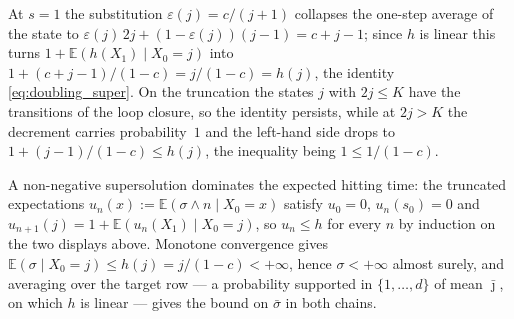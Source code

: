 At $s=1$ the substitution $\varepsilon(j)=c/(j+1)$ collapses the one-step average of the
state to $\varepsilon(j)\,2j+(1-\varepsilon(j))(j-1)=c+j-1$; since $h$ is linear this turns
$1+\mathbb E(h(X_1)\mid X_0=j)$ into $1+(c+j-1)/(1-c)=j/(1-c)=h(j)$, the identity
\eqref{eq:doubling_super}. On the truncation the states $j$ with $2j\leq K$ have the
transitions of the loop closure, so the identity persists, while at $2j>K$ the decrement
carries probability~$1$ and the left-hand side drops to $1+(j-1)/(1-c)\leq h(j)$, the
inequality being $1\leq1/(1-c)$.

A non-negative supersolution dominates the expected hitting time: the truncated expectations
$u_n(x):=\mathbb E(\sigma\wedge n\mid X_0=x)$ satisfy $u_0=0$, $u_n(s_0)=0$ and
$u_{n+1}(j)=1+\mathbb E(u_n(X_1)\mid X_0=j)$, so $u_n\leq h$ for every $n$ by induction on
the two displays above. Monotone convergence gives
$\mathbb E(\sigma\mid X_0=j)\leq h(j)=j/(1-c)<+\infty$, hence $\sigma<+\infty$ almost surely,
and averaging over the target row --- a probability supported in $\{1,\dots,d\}$ of mean
$\bar\jmath$, on which $h$ is linear --- gives the bound on $\bar\sigma$ in both chains.
